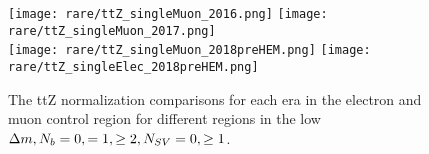 \begin{figure}[!h]
	\begin{center}
  \texttt{[image: rare/ttZ\_singleMuon\_2016.png]}
  \texttt{[image: rare/ttZ\_singleMuon\_2017.png]} \\
  \texttt{[image: rare/ttZ\_singleMuon\_2018preHEM.png]}
  \texttt{[image: rare/ttZ\_singleElec\_2018preHEM.png]} \\

	\end{center}
	\caption[ttZ Normalization Comparisons]{The ttZ normalization comparisons for each era in the electron and muon control region for different regions in the low $\Delta m, N_{b}=0,=1,\geq2, N_{SV}=0,\geq1$.
	 }
	\label{fig:rare-norm-comp}
\end{figure}